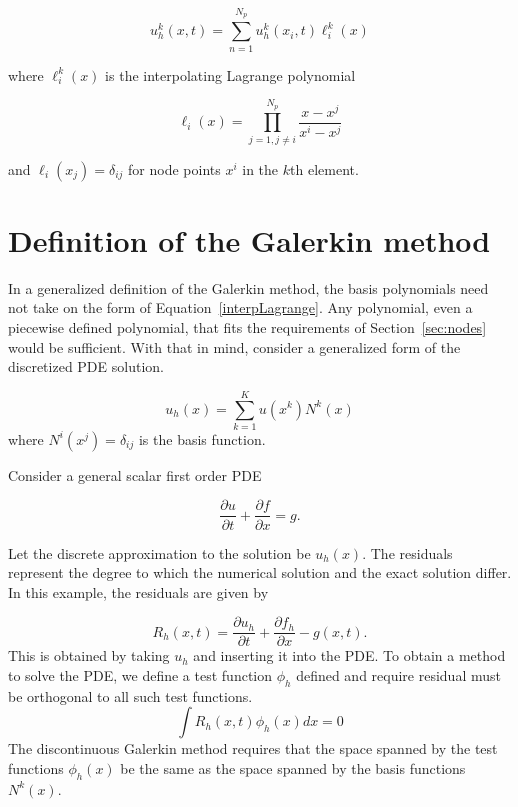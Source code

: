 \documentclass{article}
\begin{document}
\begin{equation}
u_h^k(x,t)=\displaystyle\sum_{n=1}^{N_p}u_h^k(x_i,t)\ell_i^k(x)
\label{nodal}
\end{equation}

\noindent where $\ell_i^k(x)$ is the interpolating Lagrange polynomial

\begin{equation}
\ell_i(x)=\displaystyle\prod_{j=1,j\ne i}^{N_p}\frac{x-x^j}{x^i-x^j}
\label{interpLagrange}
\end{equation}

\noindent and $\ell_i(x_j)=\delta_{ij}$ for node points $x^i$ in
the $k$th element.


\section{Definition of the Galerkin method}

In a generalized definition of the Galerkin method, the basis
polynomials need not take on the form of
Equation~\ref{interpLagrange}. Any polynomial, even a piecewise
defined polynomial, that fits the requirements of
Section~\ref{sec:nodes} would be sufficient. With that in mind,
consider a generalized form of the discretized PDE solution.

\begin{equation}
u_h(x)=\displaystyle\sum_{k=1}^{K}u(x^k)N^k(x)
\end{equation}
where $N^i(x^j)=\delta_{ij}$ is the basis function. 

Consider a general scalar first order PDE

\begin{equation}
\frac{\partial u}{\partial t}+\frac{\partial f}{\partial x} = g.
\label{firstorderpde}
\end{equation}

\noindent Let the discrete approximation to the solution be
$u_h(x)$. The residuals represent the degree to which the numerical
solution and the exact solution differ. In this example, the residuals
are given by

\begin{equation}
R_h(x,t)=\frac{\partial u_h}{\partial t}+\frac{\partial f_h}{\partial x} - g(x,t).
\label{residuals}
\end{equation}
This is obtained by taking $u_h$ and inserting it into the PDE. To
obtain a method to solve the PDE, we define a test function
$\phi_h$ defined and require residual must be orthogonal to all such test
functions.
\begin{equation}
\displaystyle\int R_h(x,t) \phi_h(x)dx=0
\end{equation}
The discontinuous Galerkin method requires that the space spanned by
the test functions $\phi_h(x)$ be the same as the space spanned by the
basis functions $N^k(x)$. 
\end{document}
